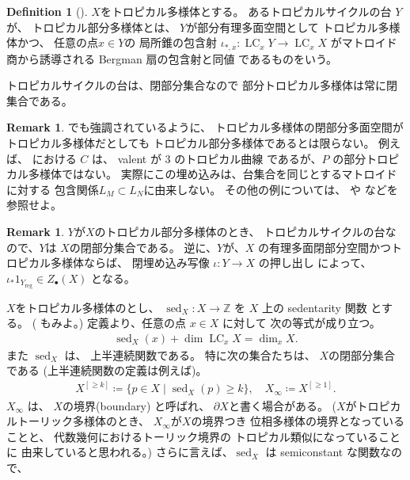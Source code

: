 \documentclass[a4paper,dvipdfmx,reqno,12pt]{amsart}
\theoremstyle{definition}
\newtheorem{definition}[theorem]{Definition}
\newtheorem{remark}[theorem]{Remark}
\newcommand{\deq}{\coloneqq}
\newcommand{\opn}[1]{\operatorname{#1}}
\numberwithin{equation}{section}
\begin{document}
\begin{definition}[{\cite[Definition 2.14]{demedrano2023chern}}]
$X$をトロピカル多様体とする。
あるトロピカルサイクルの台 $Y$ が、
トロピカル部分多様体とは、
$Y$が部分有理多面空間として
トロピカル多様体かつ、
任意の点$x\in Y$の
局所錐の包含射
$\iota_{*,x}\colon \opn{LC}_x Y\to 
\opn{LC}_x X$
がマトロイド商から誘導される
Bergman 扇の包含射と同値
であるものをいう。
\end{definition}


トロピカルサイクルの台は、閉部分集合なので
部分トロピカル多様体は常に閉集合である。

\begin{remark}
\cite[Example 2.15]{demedrano2023chern}でも強調されているように、
トロピカル多様体の閉部分多面空間がトロピカル多様体だとしても
トロピカル部分多様体であるとは限らない。
例えば、
\cite[Example 2.21]{shaw2015tropical}
における $C$ は、 valent が $3$ のトロピカル曲線
であるが、$P$ の部分トロピカル多様体ではない。
実際にこの埋め込みは、台集合を同じとするマトロイドに対する
包含関係$L_M\subset L_N$に由来しない。
その他の例については、
\cite{MR2594592} や \cite{MR3339531}
などを参照せよ。


\end{remark}

\begin{remark}
$Y$が$X$のトロピカル部分多様体のとき、
トロピカルサイクルの台なので、$Y$は
$X$の閉部分集合である。
逆に、$Y$が、$X$
の有理多面閉部分空間かつトロピカル多様体ならば、
閉埋め込み写像 $\iota\colon Y\to X$ 
の押し出し
\cite[]{demedrano2023chern}
によって、$\iota_*1_{Y_{\mathrm{reg}}}\in Z_{\bullet}(X)$
となる。
\end{remark}

$X$をトロピカル多様体のとし、
$\opn{sed}_X\colon 
X\to \mathbb{Z}$ を
$X$ 上の sedentarity 関数
\cite[Definition 7.2.6]{mikhalkin2018tropical}
とする。
(\cite[Definition 2.4]{demedrano2023chern}
もみよ。)
定義より、任意の点 $x\in X$ に対して
次の等式が成り立つ。
\begin{align}
\opn{sed}_X(x)+\dim \opn{LC}_x X=\dim_x X.
\end{align}
また $\opn{sed}_X$ は、
上半連続関数である。
特に次の集合たちは、
$X$の閉部分集合である
(上半連続関数の定義は例えば\cite[p.287]{MR463157})。
\begin{align}
X^{[\geq k]}\deq \{p\in X\mid \opn{sed}_X(p)\geq k\},
\quad 
X_{\infty}\deq X^{[\geq 1]}.
\end{align}
$X_{\infty}$ は、
$X$の境界(boundary)
と呼ばれ、
$\partial X$と書く場合がある。
($X$がトロピカルトーリック多様体のとき、
$X_{\infty}$が$X$の境界つき
位相多様体の境界となっていることと、
代数幾何におけるトーリック境界の
トロピカル類似になっていることに
由来していると思われる。)
さらに言えば、$\opn{sed}_X$ は
semiconstant な関数なので、
\end{document}
